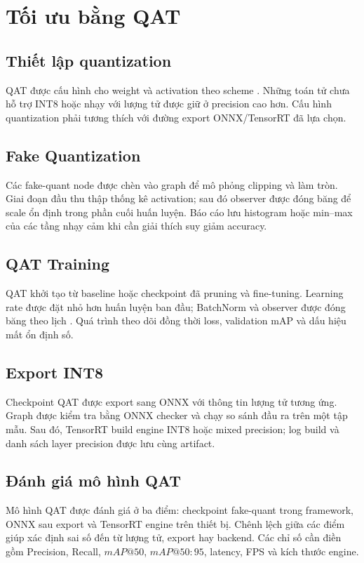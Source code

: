 \section{Tối ưu bằng QAT}

\subsection{Thiết lập quantization}

QAT được cấu hình cho weight và activation theo scheme . Những toán tử chưa hỗ trợ INT8 hoặc
nhạy với lượng tử được giữ ở precision cao hơn. Cấu hình quantization phải tương
thích với đường export ONNX/TensorRT đã lựa chọn.

\subsection{Fake Quantization}

Các fake-quant node được chèn vào graph để mô phỏng clipping và làm tròn. Giai
đoạn đầu thu thập thống kê activation; sau đó observer được đóng băng để scale ổn
định trong phần cuối huấn luyện. Báo cáo lưu histogram hoặc min--max của các
tầng nhạy cảm khi cần giải thích suy giảm accuracy.

\subsection{QAT Training}

QAT khởi tạo từ baseline hoặc checkpoint đã pruning và fine-tuning. Learning rate
được đặt nhỏ hơn huấn luyện ban đầu; BatchNorm và observer được đóng băng theo
lịch . Quá trình theo dõi đồng thời loss, validation mAP và dấu
hiệu mất ổn định số.

\subsection{Export INT8}

Checkpoint QAT được export sang ONNX với thông tin lượng tử tương ứng. Graph
được kiểm tra bằng ONNX checker và chạy so sánh đầu ra trên một tập mẫu. Sau đó,
TensorRT build engine INT8 hoặc mixed precision; log build và danh sách layer
precision được lưu cùng artifact.

\subsection{Đánh giá mô hình QAT}

Mô hình QAT được đánh giá ở ba điểm: checkpoint fake-quant trong framework,
ONNX sau export và TensorRT engine trên thiết bị. Chênh lệch giữa các điểm giúp
xác định sai số đến từ lượng tử, export hay backend. Các chỉ số cần điền gồm
Precision, Recall, $mAP@50$, $mAP@50{:}95$, latency, FPS và kích thước engine.
